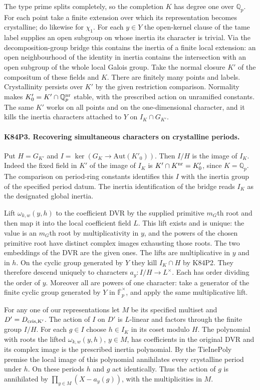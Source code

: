 The type prime splits completely, so the completion $K$ has
degree one over $\mathbb Q_p$. For each point take a finite
extension over which its representation becomes crystalline; do
likewise for $\chi_1$. For each $y\in Y$ the open-kernel clause of
the tame label supplies an open subgroup on whose inertia its
character is trivial. Via the decomposition-group bridge this
contains the inertia of a finite local extension: an open
neighbourhood of the identity in inertia contains the intersection
with an open subgroup of the whole local Galois group. Take the
normal closure $K'$ of the compositum of these fields and $K$.
There are finitely many points and labels. Crystallinity persists
over $K'$ by the given restriction comparison. Normality makes
$K'_0=K'\cap\mathbb Q_p^{\rm nr}$ stable, with the prescribed
action on unramified constants. The same $K'$ works on all points
and on the one-dimensional character, and it kills the inertia
characters attached to $Y$ on $I_K\cap G_{K'}$.

\paragraph{K84P3. Recovering simultaneous characters on crystalline periods.}
Put $H=G_{K'}$ and $I=\ker(G_K\to\mathrm{Aut}(K'_0))$.
Then $I/H$ is the image of $I_K$. Indeed the fixed field in $K'$ of the image of $I_K$ is
$K'\cap K^{\rm nr}=K'_0$, since $K=\mathbb Q_p$.
The comparison on period-ring constants identifies this $I$ with
the inertia group of the specified period datum. The inertia
identification of the bridge reads $I_K$ as the designated
global inertia.

Lift $\omega_{k,w}(y,h)$ to the coefficient DVR by the supplied
primitive $m_G$th root and then map it into the local coefficient
field $L$. This lift exists and is unique: the value is an
$m_G$th root by multiplicativity in $y$, and the powers of the
chosen primitive root have distinct complex images exhausting
those roots. The two embeddings of the DVR are the given ones.
The lifts are multiplicative in $y$ and in $h$. On the cyclic
group generated by $Y$ they kill $I_K\cap H$ by K84P2. They
therefore descend uniquely to characters $a_y:I/H\to L^\times$.
Each has order dividing the order of $y$. Moreover all are
powers of one character: take a generator of the finite cyclic
group generated by $Y$ in $\overline{\mathbb F}_p^\times$,
and apply the same multiplicative lift.

For any one of our representations let $M$ be its specified
multiset and $D'=D_{\rm cris,K'}$. The action of $I$ on $D'$
is $L$-linear and factors through the finite group $I/H$.
For each $g\in I$ choose $h\in I_K$ in its coset modulo $H$.
The polynomial with roots the lifted $\omega_{k,w}(y,h)$,
$y\in M$, has coefficients in the original DVR and its complex
image is the prescribed inertia polynomial. By the
$\mathrm{TieInePoly}$ premise the local image of this polynomial
annihilates every crystalline period under $h$. On these periods
$h$ and $g$ act identically. Thus the action of $g$ is annihilated
by $\prod_{y\in M}(X-a_y(g))$, with the multiplicities in $M$.

